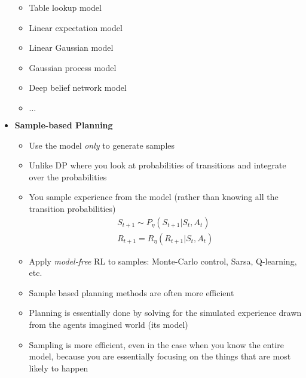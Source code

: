 \documentclass[12pt]{article}
\begin{document}
\begin{itemize}
    \begin{itemize}
      \item Table lookup model
      \item Linear expectation model
      \item Linear Gaussian model
      \item Gaussian process model
      \item Deep belief network model
      \item $\dots$
    \end{itemize}
    \item \textbf{Sample-based Planning}
    \begin{itemize}
      \item Use the model \textit{only} to generate samples
      \item Unlike DP where you look at probabilities of transitions
      and integrate over the probabilities
      \item You sample experience from the model (rather than knowing
      all the transition probabilities)
      \begin{gather*}
        S_{t+1} \sim P_\eta(S_{t+1} | S_t, A_t) \\
        R_{t+1} = R_\eta(R_{t+1} | S_t, A_t)
      \end{gather*}
      \item Apply \textit{model-free} RL to samples: Monte-Carlo control,
      Sarsa, Q-learning, etc.
      \item Sample based planning methods are often more efficient
      \item Planning is essentially done by solving for the simulated experience
      drawn from the agents imagined world (its model)
      \item Sampling is more efficient, even in the case when you know the entire model,
      because you are essentially focusing on the things that are most likely to happen
    \end{itemize}
  \end{itemize}
\end{document}
